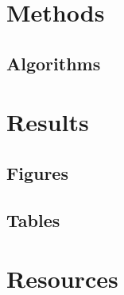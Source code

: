 \documentclass[11pt,letterpaper]{article}
\numberwithin{equation}{section} %
\numberwithin{figure}{section} %
\numberwithin{table}{section} %
\begin{document}
\section{Methods} %
\label{sec:methods}

\subsection{Algorithms} %
\label{sub:algorithms}

\section{Results} %
\label{sec:results}

\subsection{Figures} %
\label{sub:figures}


\subsection{Tables} 


\clearpage
\appendix
\section{Resources}



\clearpage
\end{document}
